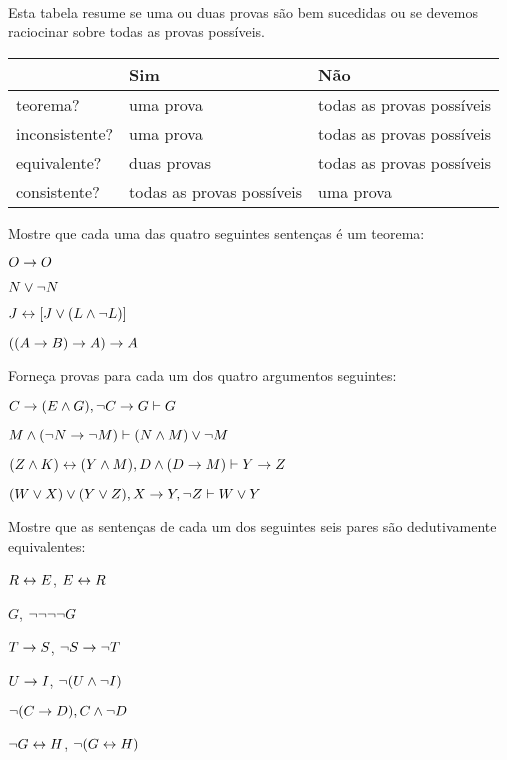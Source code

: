 \
\\
Esta tabela resume se uma ou duas provas s\~ao bem sucedidas ou se devemos raciocinar sobre todas as provas poss\'iveis.

\begin{center}
\begin{tabular}{l l l}
 & \textbf{Sim} & \textbf{ N\~ao}\\
 \hline
teorema? & uma prova & todas as provas poss\'iveis\\
inconsistente? &  uma prova  & todas as provas poss\'iveis\\
equivalente? & duas provas & todas as provas poss\'iveis\\
consistente? & todas as provas poss\'iveis & uma prova\\
\end{tabular}
\end{center}

\practiceproblems
\problempart
Mostre que cada uma das quatro seguintes senten\c cas \'e um teorema:
\begin{earg}
\item $O \rightarrow O$
\item $N \vee \neg N$
\item $J \leftrightarrow [J\vee (L\wedge\neg L)]$
\item $((A \rightarrow B) \rightarrow A) \rightarrow A$ 
\end{earg}

\problempart
Forne\c ca provas para cada um dos quatro argumentos seguintes:
\begin{earg}
\item $C\rightarrow(E\wedge G), \neg C \rightarrow G \vdash G$
\item $M \wedge (\neg N \rightarrow \neg M) \vdash (N \wedge M) \vee \neg M$
\item $(Z\wedge K)\leftrightarrow(Y\wedge M), D\wedge(D\rightarrow M) \vdash Y\rightarrow Z$
\item $(W \vee X) \vee (Y \vee Z), X\rightarrow Y, \neg Z \vdash W\vee Y$
\end{earg}

\problempart
Mostre que as sentenças de cada um dos seguintes seis pares são dedutivamente equivalentes:
\begin{earg}
\item $R \leftrightarrow E$, $E \leftrightarrow R$
\item $G$, $\neg\neg\neg\neg G$
\item $T\rightarrow S$, $\neg S \rightarrow \neg T$
\item $U \rightarrow I$, $\neg(U \wedge \neg I)$
\item $\neg (C \rightarrow D), C \wedge \neg D$
\item $\neg G \leftrightarrow H$, $\neg(G \leftrightarrow H)$ 
\end{earg}

